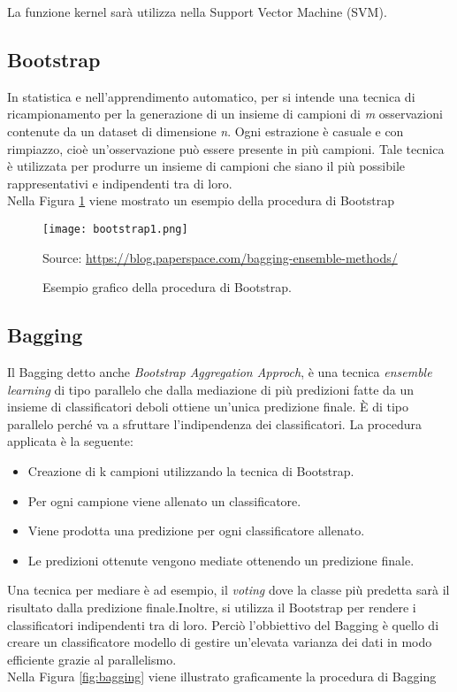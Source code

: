 La funzione kernel sarà utilizza nella Support Vector Machine (SVM).

\subsection{Bootstrap}
In statistica e nell'apprendimento automatico, per \textit{\cite{bootstrap}} si intende una tecnica di ricampionamento per la generazione di un insieme di campioni di \emph{m} osservazioni contenute da un dataset di dimensione \emph{n}. Ogni estrazione è casuale e con rimpiazzo, cioè un’osservazione può essere presente in più campioni. Tale tecnica è utilizzata per produrre un insieme di campioni che siano il più possibile rappresentativi e indipendenti tra di loro.\\

Nella Figura \ref{fig:bootstrap} viene mostrato un esempio della procedura di Bootstrap

\begin{figure}[h]
	\begin{center}
		\texttt{[image: bootstrap1.png]}
		\caption{Esempio grafico della procedura di Bootstrap.
		} 
		Source: \url{https://blog.paperspace.com/bagging-ensemble-methods/}\label{fig:bootstrap}
	\end{center}
\end{figure}

\subsection{Bagging}
Il Bagging \autocite{breiman1996bagging} detto anche \emph{Bootstrap Aggregation Approch}, è una tecnica \emph{ensemble learning} di tipo parallelo che dalla mediazione di più predizioni fatte da un insieme di classificatori deboli ottiene un'unica predizione finale. È di tipo parallelo perché va a sfruttare l'indipendenza dei classificatori. La procedura applicata è la seguente:
\begin{itemize}
	\item Creazione di k campioni utilizzando la tecnica di Bootstrap.
	\item Per ogni campione viene allenato un classificatore.
	\item Viene prodotta una predizione per ogni classificatore allenato.
	\item Le predizioni ottenute vengono mediate ottenendo un predizione finale.
\end{itemize} 
Una tecnica per mediare è ad esempio, il \emph{voting} dove la classe più predetta sarà il risultato dalla predizione finale.Inoltre, si utilizza il Bootstrap per rendere i classificatori indipendenti tra di loro.
Perciò l'obbiettivo del Bagging è quello di creare un classificatore modello di gestire un'elevata varianza dei dati in modo efficiente grazie al parallelismo.\\
Nella Figura \ref{fig:bagging} viene illustrato graficamente la procedura di Bagging

